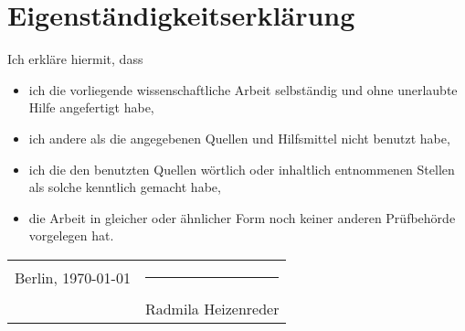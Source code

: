 \chapter{Eigenständigkeitserklärung}
\noindent Ich erkläre hiermit, dass
\begin{itemize}
    \item ich die vorliegende wissenschaftliche Arbeit selbständig und ohne unerlaubte Hilfe angefertigt habe,
    \item ich andere als die angegebenen Quellen und Hilfsmittel nicht benutzt habe,
    \item ich die den benutzten Quellen wörtlich oder inhaltlich entnommenen Stellen als solche kenntlich gemacht habe,
    \item die Arbeit in gleicher oder ähnlicher Form noch keiner anderen Prüfbehörde vorgelegen hat.
\end{itemize}
\vspace{2cm}
\begin{tabular}{@{}p{}p{}@{}}
    Berlin, \today & \hfill \rule{6cm}{0.4pt} \\
    & \hfill Radmila Heizenreder \\
\end{tabular}
